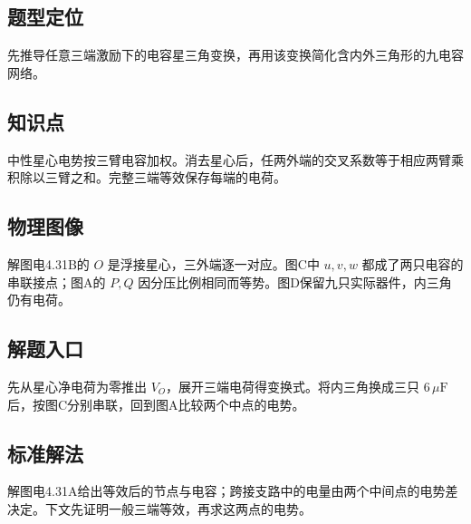 \documentclass[UTF8,fontset=fandol,a4paper,11pt]{ctexart}
\begin{document}


\subsection*{题型定位}

先推导任意三端激励下的电容星三角变换，再用该变换简化含内外三角形的九电容网络。



\subsection*{知识点}

中性星心电势按三臂电容加权。消去星心后，任两外端的交叉系数等于相应两臂乘积除以三臂之和。完整三端等效保存每端的电荷。



\subsection*{物理图像}

解图电4.31B的 $O$ 是浮接星心，三外端逐一对应。图C中 $u,v,w$ 都成了两只电容的串联接点；图A的 $P,Q$ 因分压比例相同而等势。图D保留九只实际器件，内三角仍有电荷。



\subsection*{解题入口}

先从星心净电荷为零推出 $V_O$，展开三端电荷得变换式。将内三角换成三只 $6\,\mu\mathrm F$ 后，按图C分别串联，回到图A比较两个中点的电势。


\subsection*{标准解法}

解图电4.31A给出等效后的节点与电容；跨接支路中的电量由两个中间点的电势差决定。下文先证明一般三端等效，再求这两点的电势。
\end{document}
